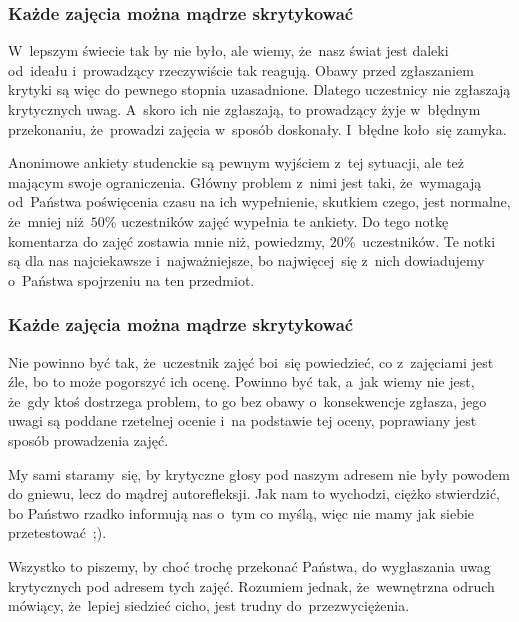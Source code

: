 \documentclass[10pt,t]{beamer}
\begin{document}
\begin{frame}
  \frametitle{Każde zajęcia można mądrze skrytykować}


  W~lepszym świecie tak by nie było, ale wiemy, że~nasz świat jest daleki
  od~ideału i~prowadzący rzeczywiście tak reagują. Obawy przed zgłaszaniem
  krytyki są więc do pewnego stopnia uzasadnione. Dlatego uczestnicy nie
  zgłaszają krytycznych uwag. A~skoro ich nie zgłaszają, to prowadzący
  żyje w~błędnym przekonaniu, że~prowadzi zajęcia w~sposób doskonały.
  I~błędne koło~się zamyka.

  Anonimowe ankiety studenckie są pewnym wyjściem z~tej sytuacji, ale też
  mającym swoje ograniczenia. Główny problem z~nimi jest taki, że~wymagają
  od~Państwa poświęcenia czasu na ich wypełnienie, skutkiem czego, jest
  normalne, że~mniej niż~$50\%$ uczestników zajęć wypełnia te ankiety. Do
  tego notkę komentarza do zajęć zostawia mnie niż, powiedzmy,
  $20\%$~uczestników. Te notki są dla nas najciekawsze i~najważniejsze, bo
  najwięcej~się z~nich dowiadujemy o~Państwa spojrzeniu na ten przedmiot.

\end{frame}





\begin{frame}
  \frametitle{Każde zajęcia można mądrze skrytykować}


  Nie powinno być tak, że~uczestnik zajęć boi~się powiedzieć, co z~zajęciami
  jest źle, bo to może pogorszyć ich ocenę. Powinno być tak, a~jak wiemy
  nie jest, że~gdy ktoś dostrzega problem, to go bez obawy o~konsekwencje
  zgłasza, jego uwagi są poddane rzetelnej ocenie i~na podstawie tej oceny,
  poprawiany jest sposób prowadzenia zajęć.

  My sami staramy~się, by krytyczne głosy pod naszym adresem nie były
  powodem do gniewu, lecz do mądrej autorefleksji. Jak nam to wychodzi,
  ciężko stwierdzić, bo Państwo rzadko informują nas o~tym co myślą,
  więc nie mamy jak siebie przetestować~;).

  Wszystko to piszemy, by choć trochę przekonać Państwa, do wygłaszania
  uwag krytycznych pod adresem tych zajęć. Rozumiem jednak, że~wewnętrzna
  odruch mówiący, że~lepiej siedzieć cicho, jest trudny
  do~przezwyciężenia.

\end{frame}
\end{document}
